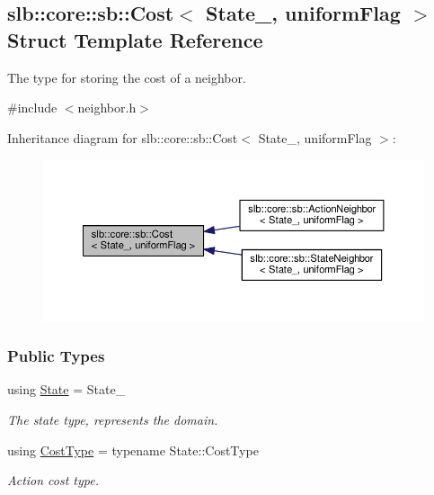\hypertarget{structslb_1_1core_1_1sb_1_1Cost}{}\subsection{slb\+:\+:core\+:\+:sb\+:\+:Cost$<$ State\+\_\+, uniform\+Flag $>$ Struct Template Reference}
\label{structslb_1_1core_1_1sb_1_1Cost}


The type for storing the cost of a neighbor.  




{\ttfamily \#include $<$neighbor.\+h$>$}



Inheritance diagram for slb\+:\+:core\+:\+:sb\+:\+:Cost$<$ State\+\_\+, uniform\+Flag $>$\+:\nopagebreak
\begin{figure}[H]
\begin{center}
\leavevmode
\includegraphics[width=350pt]{structslb_1_1core_1_1sb_1_1Cost__inherit__graph}
\end{center}
\end{figure}
\subsubsection*{Public Types}
\begin{DoxyCompactItemize}
\item 
using \hyperlink{structslb_1_1core_1_1sb_1_1Cost_af5d4c57aa664e5ae63eb365e1cecaf92}{State} = State\+\_\+\hypertarget{structslb_1_1core_1_1sb_1_1Cost_af5d4c57aa664e5ae63eb365e1cecaf92}{}\label{structslb_1_1core_1_1sb_1_1Cost_af5d4c57aa664e5ae63eb365e1cecaf92}

\begin{DoxyCompactList}\small\item\em The state type, represents the domain. \end{DoxyCompactList}\item 
using \hyperlink{structslb_1_1core_1_1sb_1_1Cost_a383726dcecbf69f396aa3a6d34b60278}{Cost\+Type} = typename State\+::\+Cost\+Type\hypertarget{structslb_1_1core_1_1sb_1_1Cost_a383726dcecbf69f396aa3a6d34b60278}{}\label{structslb_1_1core_1_1sb_1_1Cost_a383726dcecbf69f396aa3a6d34b60278}

\begin{DoxyCompactList}\small\item\em Action cost type. \end{DoxyCompactList}\end{DoxyCompactItemize}
